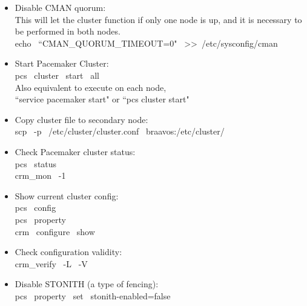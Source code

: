 \documentclass[a4paper, 12pt]{book}
\begin{document}
\begin{itemize}
	\item Disable CMAN quorum:\\
		This will let the cluster function if only one node is up, and it is necessary to be performed in both nodes.\\
		echo \ ``CMAN\_QUORUM\_TIMEOUT=0" \ \textgreater \textgreater \ /etc/sysconfig/cman
\end{itemize}

\begin{itemize}
	\item Start Pacemaker Cluster:\\
		pcs \ cluster \ start \ \textminus \textminus all\\
		Also equivalent to execute on each node,\\
		``service pacemaker start" or ``pcs cluster start"
\end{itemize}

\begin{itemize}
	\item Copy cluster file to secondary node:\\
		scp \ -p \ /etc/cluster/cluster.conf \ braavos:/etc/cluster/
\end{itemize}

\begin{itemize}
	\item Check Pacemaker cluster status:\\
		pcs \ status\\
		crm\_mon \ -1
\end{itemize}


\begin{itemize}
	\item Show current cluster config:\\
		pcs \ config\\
		pcs \ property\\
		crm \ configure \ show
\end{itemize}


\begin{itemize}
	\item Check configuration validity:\\
		crm\_verify \ -L \ -V
\end{itemize}


\begin{itemize}
	\item Disable STONITH (a type of fencing):\\
		pcs \ property \ set \ stonith-enabled=false
\end{itemize}
\end{document}
